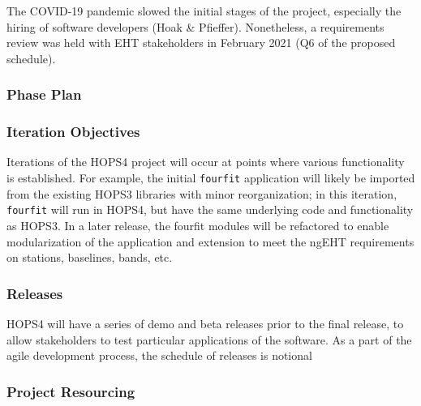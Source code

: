 The COVID-19 pandemic slowed the initial stages of the project, especially the hiring of software developers (Hoak \& Pfieffer).  Nonetheless, a requirements review was held with EHT stakeholders in February 2021 (Q6 of the proposed schedule).

\subsubsection{Phase Plan}


\subsubsection{Iteration Objectives}


Iterations of the HOPS4 project will occur at points where various functionality is established. For example, the initial \texttt{fourfit} application will likely be imported from the existing HOPS3 libraries with minor reorganization; in this iteration, \texttt{fourfit} will run in HOPS4, but have the same underlying code and functionality as HOPS3. In a later release, the fourfit modules will be refactored to enable modularization of the application and extension to meet the \ac{ngEHT} requirements on stations, baselines, bands, etc.


\subsubsection{Releases}


HOPS4 will have a series of demo and beta releases prior to the final release, to allow stakeholders to test particular applications of the software. As a part of the agile development process, the schedule of releases is notional


\subsubsection{Project Resourcing}

